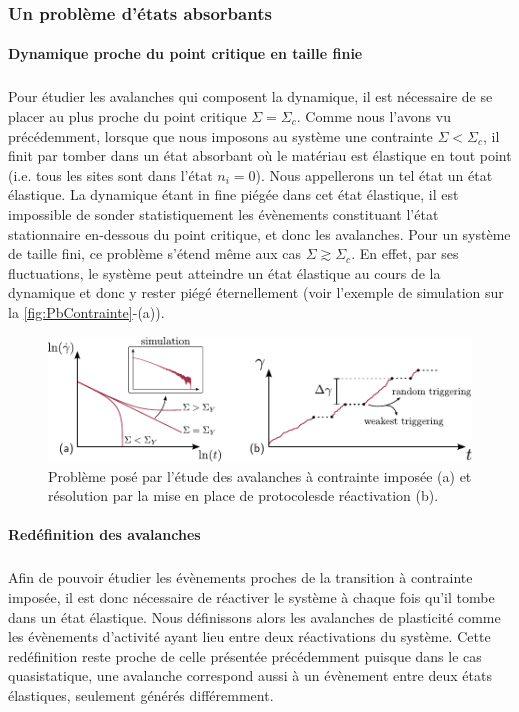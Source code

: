 \subsubsection{Un problème d'états absorbants}

\paragraph{Dynamique proche du point critique en taille finie}

\subparagraph{}Pour étudier les avalanches qui composent la dynamique, il est nécessaire de se placer au plus proche du point critique $\Sigma = \Sigma_c$. Comme nous l'avons vu précédemment, lorsque que nous imposons au système une contrainte $\Sigma < \Sigma_c$, il finit par tomber dans un état absorbant où le matériau est élastique en tout point (i.e. tous les sites sont dans l'état $n_i = 0$). Nous appellerons un tel état un état élastique. La dynamique étant in fine piégée dans cet état élastique, il est impossible de sonder statistiquement les évènements constituant l'état stationnaire en-dessous du point critique, et donc les avalanches. Pour un système de taille fini, ce problème s'étend même aux cas $\Sigma \gtrsim \Sigma_c$. En effet, par ses fluctuations, le système peut atteindre un état élastique au cours de la dynamique et donc y rester piégé éternellement (voir l'exemple de simulation sur la \autoref{fig:PbContrainte}-(a)).

\begin{figure}[h]
	\centering
	\includegraphics[width=\textwidth]{Chapitre4/Figures/Avalanches/PbContrainte.pdf}
	\caption{Problème posé par l'étude des avalanches à contrainte imposée (a) et résolution par la mise en place de protocolesde réactivation (b).}
	\label{fig:PbContrainte}
\end{figure}

\paragraph{Redéfinition des avalanches}

\subparagraph{}Afin de pouvoir étudier les évènements proches de la transition à contrainte imposée, il est donc nécessaire de réactiver le système à chaque fois qu'il tombe dans un état élastique. Nous définissons alors les avalanches de plasticité comme les évènements d'activité ayant lieu entre deux réactivations du système. Cette redéfinition reste proche de celle présentée précédemment puisque dans le cas quasistatique, une avalanche correspond aussi à un évènement entre deux états élastiques, seulement générés différemment.

